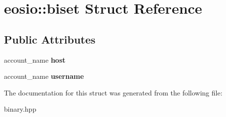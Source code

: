 \hypertarget{structeosio_1_1biset}{}\section{eosio\+:\+:biset Struct Reference}
\label{structeosio_1_1biset}
\subsection*{Public Attributes}
\begin{DoxyCompactItemize}
\item 
\mbox{\label{structeosio_1_1biset_aa9eab88d9c812c2931d25f113444d5af}} 
account\+\_\+name {\bfseries host}
\item 
\mbox{\label{structeosio_1_1biset_a96e8f32b6033b942d7833fe2d5f0874d}} 
account\+\_\+name {\bfseries username}
\end{DoxyCompactItemize}


The documentation for this struct was generated from the following file\+:\begin{DoxyCompactItemize}
\item 
binary.\+hpp\end{DoxyCompactItemize}
